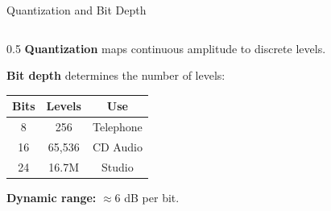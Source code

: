 \documentclass[aspectratio=169,12pt]{beamer}
\begin{document}
\begin{frame}{Quantization and Bit Depth}
    \begin{columns}
        \begin{column}{0.5\textwidth}
            \textbf{Quantization} maps continuous amplitude to discrete levels.
            
            \vspace{0.3cm}
            \textbf{Bit depth} determines the number of levels:
            \begin{center}
                \begin{tabular}{c|c|c}
                    \toprule
                    Bits & Levels & Use \\
                    \midrule
                    8 & 256 & Telephone \\
                    16 & 65,536 & CD Audio \\
                    24 & 16.7M & Studio \\
                    \bottomrule
                \end{tabular}
            \end{center}
            
            \vspace{0.2cm}
            \textbf{Dynamic range:} $\approx 6$ dB per bit.
            

\end{column}
\end{columns}
\end{frame}
\end{document}
